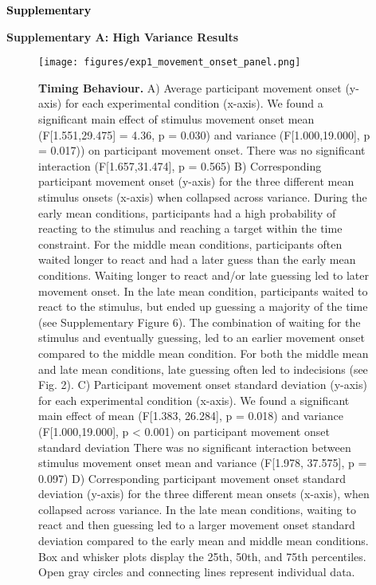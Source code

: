 \documentclass[12pt,letterpaper]{article}
\newcommand{\SectionHeader}[1]{\noindent\textbf{\Large{\textcolor{black}{#1}}}\normalsize }
\begin{document}
\SectionHeader{Supplementary}

\noindent\textbf{\large\textcolor{mydarkblue}{Supplementary A: High Variance Results}}
\begin{figure}[H]
    \centering
    \texttt{[image: figures/exp1\_movement\_onset\_panel.png]}
    \renewcommand\figurename{Supplementary Figure}
    \caption{\textbf{Timing Behaviour.} A) Average participant movement onset (y-axis) for each experimental condition (x-axis). We found a significant main effect of stimulus movement onset mean (F[1.551,29.475] = 4.36, p = 0.030) and variance (F[1.000,19.000], p = 0.017)) on participant movement onset. There was no significant interaction (F[1.657,31.474], p = 0.565) B) Corresponding participant movement onset (y-axis) for the three different mean stimulus onsets (x-axis) when collapsed across variance. During the early mean conditions, participants had a high probability of reacting to the stimulus and reaching a target within the time constraint. For the middle mean conditions, participants often waited longer to react and had a later guess than the early mean conditions. Waiting longer to react and/or late guessing led to later movement onset. In the late mean condition, participants waited to react to the stimulus, but ended up guessing a majority of the time (see Supplementary Figure 6). The combination of waiting for the stimulus and eventually guessing, led to an earlier movement onset compared to the middle mean condition. For both the middle mean and late mean conditions, late guessing often led to indecisions (see Fig. 2). C) Participant movement onset standard deviation (y-axis) for each experimental condition (x-axis). We found a significant main effect of mean (F[1.383, 26.284], p = 0.018) and variance (F[1.000,19.000], p < 0.001) on participant movement onset standard deviation There was no significant interaction between stimulus movement onset mean and variance (F[1.978, 37.575], p = 0.097) D) Corresponding participant movement onset standard deviation (y-axis) for the three different mean onsets (x-axis), when collapsed across variance. In the late mean conditions, waiting to react and then guessing led to a larger movement onset standard deviation compared to the early mean and middle mean conditions. Box and whisker plots display the 25th, 50th, and 75th percentiles. Open gray circles and connecting lines represent individual data.}
\end{figure}
\end{document}
